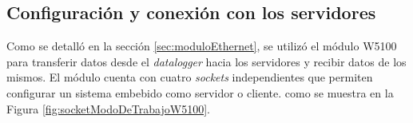 


\subsection{Configuración y conexión con los servidores}\label{sec:confServers}
Como se detalló en la sección \ref{sec:moduloEthernet}, se utilizó el módulo W5100 para transferir datos desde el \textit{datalogger} hacia los servidores y recibir datos de los mismos. El módulo cuenta con cuatro \textit{sockets} independientes que permiten configurar un sistema embebido como servidor o cliente.
como se muestra en la Figura \ref{fig:socketModoDeTrabajoW5100}.

